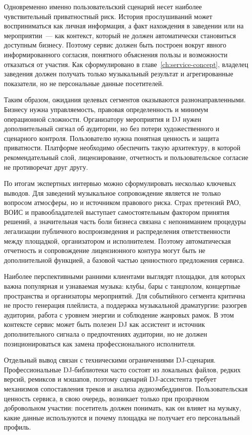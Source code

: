 Одновременно именно пользовательский сценарий несет наиболее чувствительный приватностный риск. История прослушиваний может восприниматься как личная информация, а факт нахождения в заведении или на мероприятии~--- как контекст, который не должен автоматически становиться доступным бизнесу. Поэтому сервис должен быть построен вокруг явного информированного согласия, понятного объяснения пользы и возможности отказаться от участия. Как сформулировано в главе~\ref{ch:service-concept}, владелец заведения должен получать только музыкальный результат и агрегированные показатели, но не персональные данные посетителей.

Таким образом, ожидания целевых сегментов оказываются разнонаправленными. Бизнесу нужна управляемость, правовая определенность и минимум операционной сложности. Организатору мероприятия и DJ нужен дополнительный сигнал об аудитории, но без потери художественного и сценарного контроля. Пользователю нужна понятная ценность и защита приватности. Платформе необходимо обеспечить такую архитектуру, в которой рекомендательный слой, лицензирование, отчетность и пользовательское согласие не противоречат друг другу.

По итогам экспертных интервью можно сформулировать несколько ключевых выводов. Для заведений музыкальное сопровождение является не только вопросом атмосферы, но и источником правового риска. Страх претензий РАО, ВОИС и правообладателей выступает самостоятельным фактором принятия решений, а значительная часть боли бизнеса связана с непониманием процедуры легализации публичного воспроизведения и распределения ответственности между площадкой, организатором и исполнителем. Поэтому автоматическая отчетность и сопровождение лицензионного контура могут быть не дополнительной функцией, а базовой частью ценностного предложения сервиса.

Наиболее перспективными ранними клиентами выглядят площадки, для которых важна популярная и узнаваемая музыка: клубы, бары с танцполом, концертные пространства и организаторы мероприятий. Для событийного сегмента критична не просто генерация плейлиста, а поддержка музыкальной драматургии: разогрев аудитории, работа с уровнем энергии и соблюдение жанровых рамок. В этом контексте сервис может быть полезен DJ как ассистент и источник дополнительного сигнала о предпочтениях аудитории, но не должен позиционироваться как замена профессионального исполнителя.

Отдельный вывод связан с техническими ограничениями DJ-сценария. Профессиональные DJ-библиотеки часто состоят из локальных файлов, редких версий, ремиксов и мэшапов, поэтому сценарий DJ-ассистента требует механизмов сопоставления треков и анализа аудиоэмбеддингов. Пользовательская ценность сервиса, в свою очередь, возникает только при прозрачном добровольном участии: посетитель должен понимать, как он влияет на музыку, какие данные используются и почему площадка не получает его персональный профиль.

